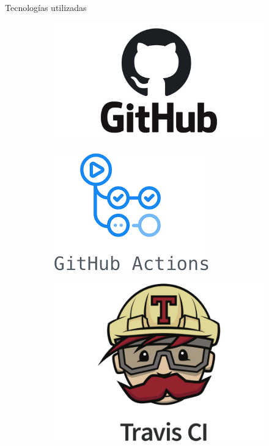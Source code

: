 \documentclass[11pt]{beamer}    %
\begin{document}
\begin{frame}{Tecnologías utilizadas}
\begin{figure}
\begin{subfigure}[t]{0.33\textwidth}
            \end{subfigure}
            \par\bigskip
            \begin{subfigure}[t]{0.33\textwidth}
                \centering
                \includegraphics[scale=0.3]{img/presentation/github}
            \end{subfigure}%
            \begin{subfigure}[t]{0.33\textwidth}
                \centering
                \includegraphics[scale=1]{img/presentation/github-actions}
            \end{subfigure}%
            \begin{subfigure}[t]{0.33\textwidth}
                \centering
                \includegraphics[scale=0.15]{img/presentation/travisci}
            \end{subfigure}
        \end{figure}
    \end{frame}
\end{document}
